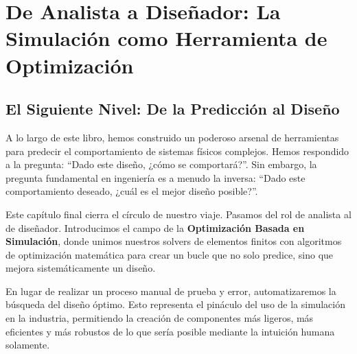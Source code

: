 \chapter{De Analista a Diseñador: La Simulación como Herramienta de Optimización}
\label{chap:optimization}

\section{El Siguiente Nivel: De la Predicción al Diseño}

A lo largo de este libro, hemos construido un poderoso arsenal de herramientas para predecir el comportamiento de sistemas físicos complejos. Hemos respondido a la pregunta: ``Dado este diseño, ¿cómo se comportará?''. Sin embargo, la pregunta fundamental en ingeniería es a menudo la inversa: ``Dado este comportamiento deseado, ¿cuál es el mejor diseño posible?''.

Este capítulo final cierra el círculo de nuestro viaje. Pasamos del rol de analista al de diseñador. Introducimos el campo de la \textbf{Optimización Basada en Simulación}, donde unimos nuestros solvers de elementos finitos con algoritmos de optimización matemática para crear un bucle que no solo predice, sino que mejora sistemáticamente un diseño.

En lugar de realizar un proceso manual de prueba y error, automatizaremos la búsqueda del diseño óptimo. Esto representa el pináculo del uso de la simulación en la industria, permitiendo la creación de componentes más ligeros, más eficientes y más robustos de lo que sería posible mediante la intuición humana solamente.

